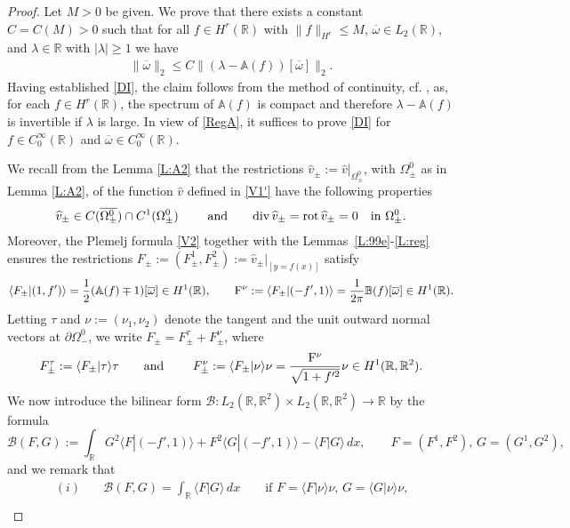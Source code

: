 \documentclass[11pt,reqno]{amsart}
\numberwithin{equation}{section}
\newcommand{\0}{\Omega}
\newcommand{\p}{\partial}
\newcommand{\ov}{\overline}
\newcommand{\wh}{\widehat}
\newcommand{\oo}{\ov\omega}
\newcommand{\bA}{\mathbb{A}}
\newcommand{\B}{\mathcal{B}}
\newcommand{\bB}{\mathbb{B}}
\newcommand{\R}{\mathbb{R}}
\numberwithin{equation}{section}
\begin{document}
\begin{proof}
Let  $M>0$ be given. We prove that there exists a constant $C=C(M)>0$ such that for all   $f\in H^r(\R)$ with $\|f\|_{H^r}\leq M$,  $\ov\omega\in L_2(\R)$, and $\lambda\in\R$ with $|\lambda|\geq1$ we have
 \begin{align}\label{DI}
\|\ov\omega\|_{2}\leq C\|(\lambda-\bA(f))[\ov\omega]\|_2.
\end{align}
Having established \eqref{DI}, the claim follows from  the method of continuity, cf. \cite[Proposition 1.1.1]{Am95}, as, for each  $f\in H^r(\R)$,  the spectrum of $\bA(f)$ is compact and therefore
$\lambda-\bA(f)$ is  invertible  if $\lambda$ is large. 
In view of \eqref{RegA}, it suffices to prove \eqref{DI} for   $f\in C^\infty_0(\R)$   and   $\ov\omega\in C_0^\infty(\R)$.

We recall from the Lemma \ref{L:A2} that the restrictions $\wh v_\pm:=\wh v\big|_{\0_\pm^0}$, with $\0_\pm^0$ as in Lemma \ref{L:A2}, of the function $\wh v$ defined in \eqref{V1'}
have the following properties
\begin{align}\label{diro}
 \text{$ \wh v_\pm  \in  C (\ov{\0_\pm^0})\cap C^1({\0_\pm^0})$ \qquad and\qquad  ${\rm div \, } \wh v_\pm={\rm rot \, } \wh v_\pm=0$\quad\text{in $\0_\pm^0$.}}
\end{align}
Moreover,    the Plemelj formula \eqref{V2}  together with the Lemmas~\ref{L:99e}-\ref{L:reg}  ensures the restrictions $F_\pm:=(F_\pm^{1}, F_\pm^2):=\wh v_\pm\big|_{[y=f(x)]}$  satisfy
\begin{align}\label{BB1}
  \langle F_\pm|(1,f')\rangle=\frac{1}{2}(\bA(f)\mp 1 )[\oo]\in H^1(\R),\qquad {\rm F}^\nu:=\langle F_\pm|(-f',1)\rangle=\frac{1}{2\pi}\bB(f)[\oo]\in H^1(\R).
\end{align}
Letting $\tau$ and $\nu:=(\nu_1,\nu_2)$ denote the tangent and the   unit outward normal vectors at $\p \0_-^0$, we write
$F_\pm=F_\pm^\tau+F_\pm^\nu$, where 
\[\text{$F_\pm^\tau:=\langle F_\pm|\tau\rangle\tau$\qquad  and \qquad  $F_\pm^\nu:=\langle F_\pm|\nu\rangle\nu=\frac{{\rm F}^\nu}{\sqrt{1+f'^2}}\nu\in H^1(\R,\R^2)$.}\]
We now introduce the bilinear form $\B:L_2(\R,\R^2)\times L_2(\R,\R^2)\to\R$ by the formula
\[
\B(F,G):=\int_{\R}G^2\langle F|(-f',1) \rangle +F^2\langle G|(-f',1) \rangle -\langle  F|G \rangle\, dx,\qquad F=(F^1,F^2),\, G=(G^1,G^2),
\]
 and we remark that
\begin{align*}
 (i)&\quad \B(F,G)=\int_{\R} \langle F|  G  \rangle   \, dx \qquad\text{if $F=\langle F|\nu\rangle\nu$, $G=\langle G|\nu\rangle\nu$,}\\[1ex]

\end{align*}
\end{proof}
\end{document}
